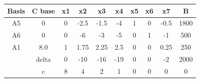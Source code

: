 \documentclass[17pt]{extarticle}
\begin{document}
\begin{table}[h!]
    \centering
    \begin{tabular}{c|c|ccccccc|c}
        \toprule
        Basis & C base & x1 & x2   & x3   & x4  & x5 & x6 & x7   & B    \\
        \midrule
        A5    & 0      & 0  & -2.5 & -1.5 & -4  & 1  & 0  & -0.5 & 1800 \\
        A6    & 0      & 0  & -6   & -3   & -5  & 0  & 1  & -1   & 500  \\
        A1    & 8.0    & 1  & 1.75 & 2.25 & 2.5 & 0  & 0  & 0.25 & 250  \\
        \midrule
              & delta  & 0  & -10  & -16  & -19 & 0  & 0  & -2   & 2000 \\
              & c      & 8  & 4    & 2    & 1   & 0  & 0  & 0    & 0    \\
        \bottomrule
    \end{tabular}
\end{table}
\end{document}
